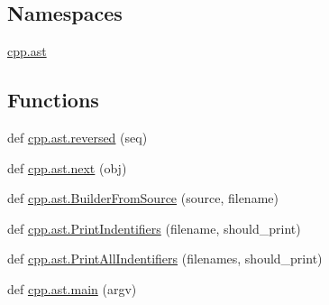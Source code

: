 \subsection*{Namespaces}
\begin{DoxyCompactItemize}
\item 
 \mbox{\hyperlink{namespacecpp_1_1ast}{cpp.\+ast}}
\end{DoxyCompactItemize}
\subsection*{Functions}
\begin{DoxyCompactItemize}
\item 
def \mbox{\hyperlink{namespacecpp_1_1ast_a0b1c00fd4aaa476b10de6b3a2550f39f}{cpp.\+ast.\+reversed}} (seq)
\item 
def \mbox{\hyperlink{namespacecpp_1_1ast_a39ad8261fef5e0a7c1c17c510541b66f}{cpp.\+ast.\+next}} (obj)
\item 
def \mbox{\hyperlink{namespacecpp_1_1ast_a696471f0d7971a0789824803a008cf6b}{cpp.\+ast.\+Builder\+From\+Source}} (source, filename)
\item 
def \mbox{\hyperlink{namespacecpp_1_1ast_a6a793b93aff7779af7017d001ce3b226}{cpp.\+ast.\+Print\+Indentifiers}} (filename, should\+\_\+print)
\item 
def \mbox{\hyperlink{namespacecpp_1_1ast_abc501124095357c1cf56eaf10e1df327}{cpp.\+ast.\+Print\+All\+Indentifiers}} (filenames, should\+\_\+print)
\item 
def \mbox{\hyperlink{namespacecpp_1_1ast_acd29cc27c3bff13bf3e055575b8e958a}{cpp.\+ast.\+main}} (argv)
\end{DoxyCompactItemize}
